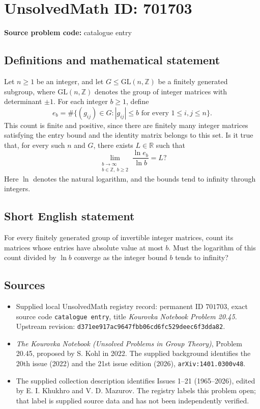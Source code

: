 \documentclass[11pt]{article}
\newcommand{\Z}{\mathbb{Z}}
\newcommand{\R}{\mathbb{R}}
\begin{document}
\section*{UnsolvedMath ID: 701703}
\textbf{Source problem code:} catalogue entry
\subsection{Definitions and mathematical statement}
Let \(n\geq 1\) be an integer, and let \(G\leq \mathrm{GL}(n,\Z)\) be a finitely generated subgroup, where \(\mathrm{GL}(n,\Z)\) denotes the group of integer matrices with determinant \(\pm1\). For each integer \(b\geq1\), define
\[
e_b=\#\bigl\{(g_{ij})\in G: |g_{ij}|\leq b\text{ for every }1\leq i,j\leq n\bigr\}.
\]
This count is finite and positive, since there are finitely many integer matrices satisfying the entry bound and the identity matrix belongs to this set. Is it true that, for every such \(n\) and \(G\), there exists \(L\in\R\) such that
\[
\lim_{\substack{b\to\infty\\ b\in\Z,\ b\geq2}}\frac{\ln e_b}{\ln b}=L?
\]
Here \(\ln\) denotes the natural logarithm, and the bounds tend to infinity through integers.
\subsection{Short English statement}
For every finitely generated group of invertible integer matrices, count its matrices whose entries have absolute value at most \(b\). Must the logarithm of this count divided by \(\ln b\) converge as the integer bound \(b\) tends to infinity?
\subsection{Sources}
\begin{itemize}
\item Supplied local UnsolvedMath registry record: permanent ID \(701703\), exact source code \texttt{catalogue entry}, title \emph{Kourovka Notebook Problem 20.45}. Upstream revision: \texttt{d371ee917ac9647fbb06cd6fc529deec6f3dda82}.
\item \emph{The Kourovka Notebook (Unsolved Problems in Group Theory)}, Problem 20.45, proposed by S. Kohl in 2022. The supplied background identifies the 20th issue (2022) and the 21st issue edition (2026), \texttt{arXiv:1401.0300v48}.
\item The supplied collection description identifies Issues 1--21 (1965--2026), edited by E. I. Khukhro and V. D. Mazurov. The registry labels this problem open; that label is supplied source data and has not been independently verified.
\end{itemize}
\end{document}
